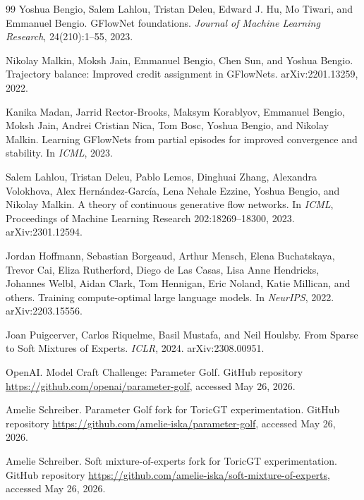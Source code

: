 \documentclass[11pt]{article}
\theoremstyle{definition}
\theoremstyle{plain}
\theoremstyle{remark}
\numberwithin{equation}{section}
\begin{document}
\begin{thebibliography}{99}
Yoshua Bengio, Salem Lahlou, Tristan Deleu, Edward J. Hu, Mo Tiwari, and Emmanuel Bengio.
\newblock GFlowNet foundations.
\newblock \emph{Journal of Machine Learning Research}, 24(210):1--55, 2023.

Nikolay Malkin, Moksh Jain, Emmanuel Bengio, Chen Sun, and Yoshua Bengio.
\newblock Trajectory balance: Improved credit assignment in GFlowNets.
\newblock arXiv:2201.13259, 2022.

Kanika Madan, Jarrid Rector-Brooks, Maksym Korablyov, Emmanuel Bengio, Moksh Jain, Andrei Cristian Nica, Tom Bosc, Yoshua Bengio, and Nikolay Malkin.
\newblock Learning GFlowNets from partial episodes for improved convergence and stability.
\newblock In \emph{ICML}, 2023.

Salem Lahlou, Tristan Deleu, Pablo Lemos, Dinghuai Zhang, Alexandra Volokhova, Alex Hern\'andez-Garc\'ia, Lena Nehale Ezzine, Yoshua Bengio, and Nikolay Malkin.
\newblock A theory of continuous generative flow networks.
\newblock In \emph{ICML}, Proceedings of Machine Learning Research 202:18269--18300, 2023. arXiv:2301.12594.

Jordan Hoffmann, Sebastian Borgeaud, Arthur Mensch, Elena Buchatskaya, Trevor Cai, Eliza Rutherford, Diego de Las Casas, Lisa Anne Hendricks, Johannes Welbl, Aidan Clark, Tom Hennigan, Eric Noland, Katie Millican, and others.
\newblock Training compute-optimal large language models.
\newblock In \emph{NeurIPS}, 2022. arXiv:2203.15556.


Joan Puigcerver, Carlos Riquelme, Basil Mustafa, and Neil Houlsby.
\newblock From Sparse to Soft Mixtures of Experts.
\newblock \emph{ICLR}, 2024. arXiv:2308.00951.

OpenAI.
\newblock Model Craft Challenge: Parameter Golf.
\newblock GitHub repository \url{https://github.com/openai/parameter-golf}, accessed May 26, 2026.

Amelie Schreiber.
\newblock Parameter Golf fork for ToricGT experimentation.
\newblock GitHub repository \url{https://github.com/amelie-iska/parameter-golf}, accessed May 26, 2026.

Amelie Schreiber.
\newblock Soft mixture-of-experts fork for ToricGT experimentation.
\newblock GitHub repository \url{https://github.com/amelie-iska/soft-mixture-of-experts}, accessed May 26, 2026.


\end{thebibliography}
\end{document}
